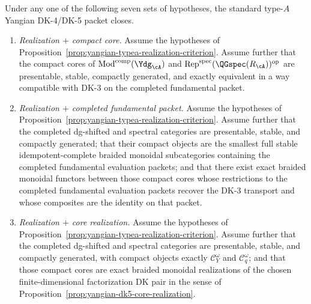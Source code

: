 \begin{theorem}
\label{thm:yangian-dk45-closure-variants}%
\label{thm:yangian-typea-realization-plus-compacts}%
\label{thm:yangian-typea-realization-plus-fundamental-packet}%
\label{thm:yangian-typea-realization-plus-core-realization}%
\label{thm:yangian-formal-moduli-plus-core-realization}%
\label{thm:yangian-typea-realization-plus-dg-packet}%
\label{thm:yangian-canonical-realization-plus-one-seed}%
\label{thm:yangian-canonical-realization-plus-vector-line}%
Under any one of the following seven sets of hypotheses, the standard
type-$A$ Yangian DK-4/DK-5 packet closes.
\begin{enumerate}[label=\textup{(\roman*)}]
\item\emph{Realization $+$ compact core.}
 Assume the hypotheses of
 Proposition~\ref{prop:yangian-typea-realization-criterion}. Assume
 further that the compact cores of
 \(\operatorname{Mod}^{\mathrm{comp}}(\Ydg_{\cA})\) and
 \(\operatorname{Rep}^{\mathrm{spec}}(\QGspec(R_{\cA}))^{\mathrm{op}}\)
 are presentable, stable, compactly generated, and exactly equivalent
 in a way compatible with DK-3 on the completed fundamental packet.

\item\emph{Realization $+$ completed fundamental packet.}
 Assume the hypotheses of
 Proposition~\ref{prop:yangian-typea-realization-criterion}. Assume
 further that the completed dg-shifted and spectral categories are
 presentable, stable, and compactly generated; that their compact
 objects are the smallest full stable idempotent-complete braided
 monoidal subcategories containing the completed fundamental
 evaluation packets; and that there exist exact braided monoidal
 functors between those compact cores whose restrictions to the
 completed fundamental evaluation packets recover the DK-3 transport
 and whose composites are the identity on that packet.

\item\emph{Realization $+$ core realization.}
 Assume the hypotheses of
 Proposition~\ref{prop:yangian-typea-realization-criterion}. Assume
 further that the completed dg-shifted and spectral categories are
 presentable, stable, and compactly generated, with compact objects
 exactly $\mathcal{C}_Y^\omega$ and $\mathcal{C}_q^\omega$; and that
 those compact cores are exact braided monoidal realizations of the
 chosen finite-dimensional factorization DK pair in the sense of
 Proposition~\ref{prop:yangian-dk5-core-realization}.


\end{enumerate}
\end{theorem}
